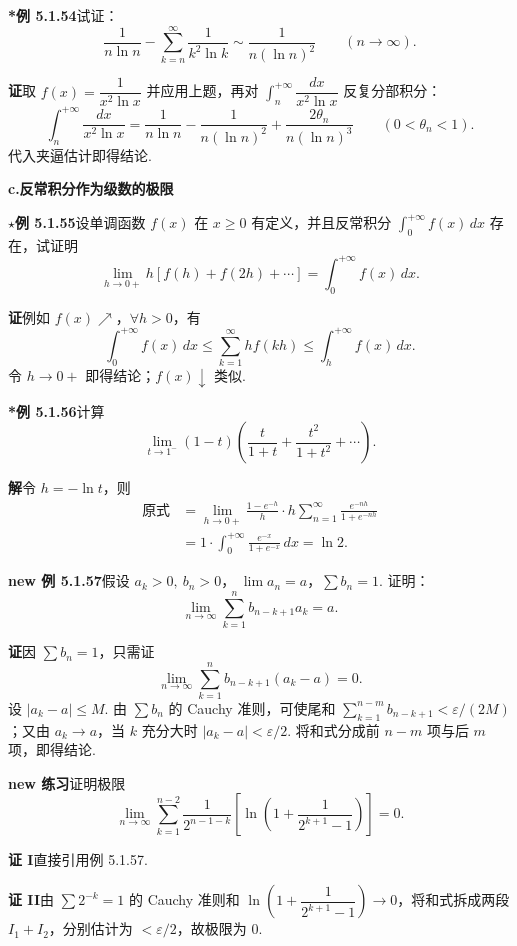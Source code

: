 \documentclass[UTF8,12pt,a4paper,fontset=fandol]{ctexart}
\begin{document}
\noindent\textbf{*例 5.1.54}\quad 试证：
\[
  \frac1{n\ln n}-\sum_{k=n}^{\infty}\frac1{k^2\ln k}
  \sim\frac1{n(\ln n)^2}\qquad(n\to\infty).
\]

\noindent\textbf{证}\quad 取 $f(x)=\dfrac1{x^2\ln x}$ 并应用上题，再对
$\displaystyle\int_n^{+\infty}\dfrac{dx}{x^2\ln x}$ 反复分部积分：
\[
  \int_n^{+\infty}\frac{dx}{x^2\ln x}
  =\frac1{n\ln n}-\frac1{n(\ln n)^2}
  +\frac{2\theta_n}{n(\ln n)^3}\qquad(0<\theta_n<1).
\]
代入夹逼估计即得结论.

\noindent\textbf{c.\quad 反常积分作为级数的极限}

\noindent\textbf{$\star$例 5.1.55}\quad 设单调函数 $f(x)$ 在 $x\ge0$ 有定义，并且反常积分 $\displaystyle\int_0^{+\infty}f(x)\,dx$ 存在，试证明
\[
  \lim_{h\to0+}h[f(h)+f(2h)+\cdots]
  =\int_0^{+\infty}f(x)\,dx.
\]

\noindent\textbf{证}\quad 例如 $f(x)\nearrow$，$\forall h>0$，有
\[
  \int_0^{+\infty}f(x)\,dx
  \le\sum_{k=1}^{\infty}hf(kh)
  \le\int_h^{+\infty}f(x)\,dx.
\]
令 $h\to0+$ 即得结论；$f(x)\downarrow$ 类似.

\noindent\textbf{*例 5.1.56}\quad 计算
\[
  \lim_{t\to1^-}(1-t)\left(\frac t{1+t}+\frac{t^2}{1+t^2}+\cdots\right).
\]

\noindent\textbf{解}\quad 令 $h=-\ln t$，则
\[
\begin{aligned}
\text{原式}
&=\lim_{h\to0+}\frac{1-e^{-h}}h\cdot
h\sum_{n=1}^{\infty}\frac{e^{-nh}}{1+e^{-nh}}\\
&=1\cdot\int_0^{+\infty}\frac{e^{-x}}{1+e^{-x}}\,dx=\ln2.
\end{aligned}
\]

\noindent\textbf{new 例 5.1.57}\quad 假设 $a_k>0,\ b_n>0$，
$\lim a_n=a$，$\displaystyle\sum b_n=1$. 证明：
\[
  \lim_{n\to\infty}\sum_{k=1}^n b_{n-k+1}a_k=a.
\]

\noindent\textbf{证}\quad 因 $\sum b_n=1$，只需证
\[
  \lim_{n\to\infty}\sum_{k=1}^n b_{n-k+1}(a_k-a)=0.
\]
设 $|a_k-a|\le M$. 由 $\sum b_n$ 的 Cauchy 准则，可使尾和
$\sum_{k=1}^{n-m}b_{n-k+1}<\varepsilon/(2M)$；又由 $a_k\to a$，当 $k$ 充分大时 $|a_k-a|<\varepsilon/2$. 将和式分成前 $n-m$ 项与后 $m$ 项，即得结论.

\noindent\textbf{new 练习}\quad 证明极限
\[
  \lim_{n\to\infty}\sum_{k=1}^{n-2}
  \frac1{2^{n-1-k}}\left[\ln\left(1+\frac1{2^{k+1}-1}\right)\right]=0.
\]

\noindent\textbf{证 I}\quad 直接引用例 5.1.57.

\noindent\textbf{证 II}\quad 由 $\sum 2^{-k}=1$ 的 Cauchy 准则和
$\ln\left(1+\dfrac1{2^{k+1}-1}\right)\to0$，将和式拆成两段 $I_1+I_2$，分别估计为 $<\varepsilon/2$，故极限为 $0$.
\end{document}
